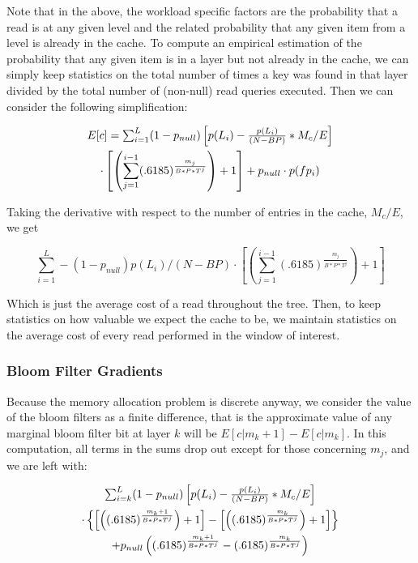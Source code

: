 \documentclass{cidr-2019}
\begin{document}
Note that in the above, the workload specific factors are the probability that
a read is at any given level and the related probability that any given item
from a level is already in the cache. To compute an empirical estimation of the
probability that any given item is in a layer but not already in the cache, we
can simply keep statistics on the total number of times a key was found in that
layer divided by the total number of (non-null) read queries executed. Then we
can consider the following simplification:

\begin{multline}
$$E[c] = \sum_{i=1}^{L} (1-p_{null})\left[p(L_i) - \frac{p(L_i)}{(N - BP)} * M_c/E \right]\\ \cdot \left[ \left(\sum_{j=1}^{i-1} (.6185) ^  {\frac{m_j}{B*P*T^j}}\right) +1 \right] + p_{null} \cdot p(fp_i) $$
\end{multline}

Taking the derivative with respect to the number of entries in the cache,
$M_c/E$, we get 

$$
\sum_{i=1}^{L}  -(1-p_{null}) p(L_i)/(N - BP) \cdot \left[ \left(\sum_{j=1}^{i-1} (.6185) ^  {\frac{m_j}{B*P*T^j}}\right) +1 \right]
$$

Which is just the average cost of a read throughout the tree. Then, to keep
statistics on how valuable we expect the cache to be, we maintain statistics on
the average cost of every read performed in the window of interest.

\subsubsection{Bloom Filter Gradients}

Because the memory allocation problem is discrete anyway, we consider the value
of the bloom filters as a finite difference, that is the approximate value of
any marginal bloom filter bit at layer $k$ will be $E[c | m_k+1] - E[c | m_k]$.
In this computation, all terms in the sums drop out except for those concerning
$m_j$, and we are left with:

\begin{multline}
$$\sum_{i=k}^{L} (1-p_{null})\left[p(L_i) - \frac{p(L_i)}{(N - BP)} * M_c/E \right] \\ \cdot \left\{ \left[ \left( (.6185) ^  {\frac{m_k+1}{B*P*T^j}}\right) +1 \right] - \left[ \left( (.6185) ^  {\frac{m_k}{B*P*T^j}}\right) +1 \right] \right\} \\+ p_{null}  \left( (.6185) ^  {\frac{m_k+1}{B*P*T^j}} - (.6185) ^  {\frac{m_k}{B*P*T^j}}\right)$$
\end{multline}
\end{document}
